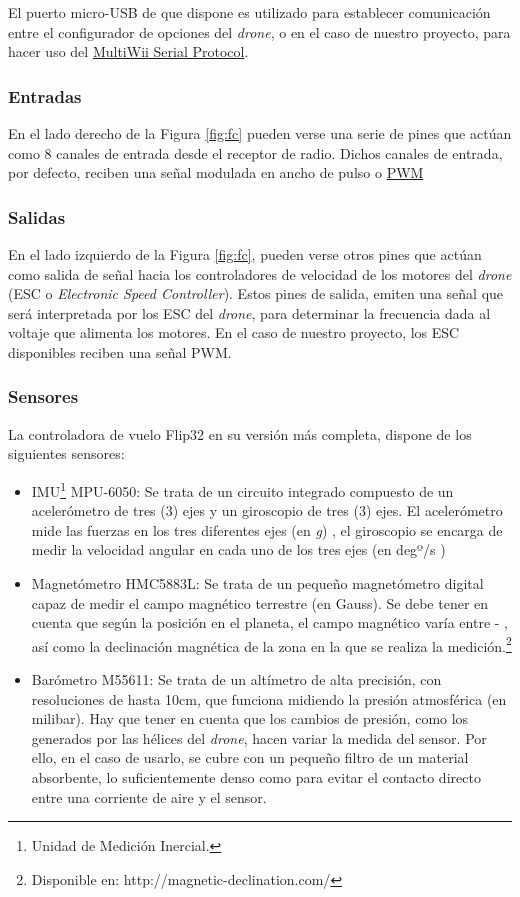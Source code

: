 El puerto micro-USB de que dispone es utilizado para establecer comunicación entre el configurador de opciones del \emph{drone}, o en el caso de nuestro proyecto, para hacer uso del \hyperref[subsec:MSP]{MultiWii Serial Protocol}. 


\subsubsection{Entradas}
En el lado derecho de la Figura \ref{fig:fc} pueden verse una serie de pines que actúan como 8 canales de entrada desde el receptor de radio.
Dichos canales de entrada, por defecto, reciben una señal modulada en ancho de pulso o \hyperref[subsec:PWM]{PWM}

 

\subsubsection{Salidas}
En el lado izquierdo de la Figura \ref{fig:fc}, pueden verse otros pines que actúan como salida de señal hacia los controladores de velocidad de los motores del \emph{drone} (ESC o \textit{Electronic Speed Controller}).
Estos pines de salida, emiten una señal que será interpretada por los ESC del \emph{drone}, para determinar la frecuencia dada al voltaje que alimenta los motores. En el caso de nuestro proyecto, los ESC disponibles reciben una señal PWM.

\subsubsection{Sensores}
\label{subsubsec:sensors}
La controladora de vuelo Flip32 en su versión más completa, dispone de los siguientes sensores:
\begin{itemize}
\item IMU\footnote{Unidad de Medición Inercial.} MPU-6050: Se trata de un circuito integrado compuesto de un acelerómetro de tres (3) ejes y un giroscopio de tres (3) ejes. El acelerómetro mide las fuerzas en los tres diferentes ejes (en \textit{g}) , el giroscopio se encarga de medir la velocidad angular en cada uno de los tres ejes (en degº/s )
\item Magnetómetro HMC5883L: Se trata de un pequeño magnetómetro digital capaz de medir el campo magnético terrestre (en Gauss). Se debe tener en cuenta que según la posición en el planeta, el campo magnético varía entre \si{} - \si{}, así como la declinación magnética de la zona en la que se realiza la medición.\footnote{Disponible en: http://magnetic-declination.com/}
\item Barómetro M55611: Se trata de un altímetro de alta precisión, con resoluciones de hasta 10cm, que funciona midiendo la presión atmosférica (en milibar). Hay que tener en cuenta que los cambios de presión, como los generados por las hélices del \emph{drone}, hacen variar la medida del sensor. Por ello, en el caso de usarlo, se cubre con un pequeño filtro de un material absorbente, lo suficientemente denso como para evitar el contacto directo entre una corriente de aire y el sensor.
\end{itemize}

